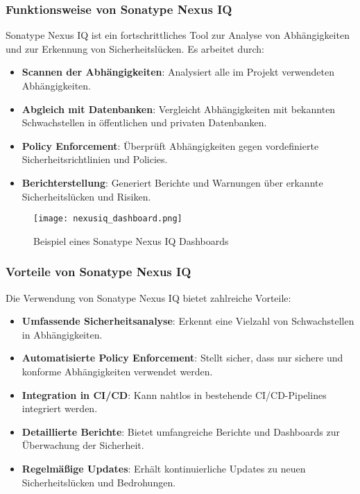 \subsubsection{Funktionsweise von Sonatype Nexus IQ}

Sonatype Nexus IQ ist ein fortschrittliches Tool zur Analyse von Abhängigkeiten und zur Erkennung von Sicherheitslücken. Es arbeitet durch:

\begin{itemize}
    \item \textbf{Scannen der Abhängigkeiten}: Analysiert alle im Projekt verwendeten Abhängigkeiten.
    \item \textbf{Abgleich mit Datenbanken}: Vergleicht Abhängigkeiten mit bekannten Schwachstellen in öffentlichen und privaten Datenbanken.
    \item \textbf{Policy Enforcement}: Überprüft Abhängigkeiten gegen vordefinierte Sicherheitsrichtlinien und Policies.
    \item \textbf{Berichterstellung}: Generiert Berichte und Warnungen über erkannte Sicherheitslücken und Risiken.
\end{itemize}

\begin{figure*}[h!]
\centering
\texttt{[image: nexusiq\_dashboard.png]}
\caption{Beispiel eines Sonatype Nexus IQ Dashboards}
\label{fig:nexusiq_dashboard}
\end{figure*}

\subsubsection{Vorteile von Sonatype Nexus IQ}

Die Verwendung von Sonatype Nexus IQ bietet zahlreiche Vorteile:

\begin{itemize}
    \item \textbf{Umfassende Sicherheitsanalyse}: Erkennt eine Vielzahl von Schwachstellen in Abhängigkeiten.
    \item \textbf{Automatisierte Policy Enforcement}: Stellt sicher, dass nur sichere und konforme Abhängigkeiten verwendet werden.
    \item \textbf{Integration in CI/CD}: Kann nahtlos in bestehende CI/CD-Pipelines integriert werden.
    \item \textbf{Detaillierte Berichte}: Bietet umfangreiche Berichte und Dashboards zur Überwachung der Sicherheit.
    \item \textbf{Regelmäßige Updates}: Erhält kontinuierliche Updates zu neuen Sicherheitslücken und Bedrohungen.
\end{itemize}


